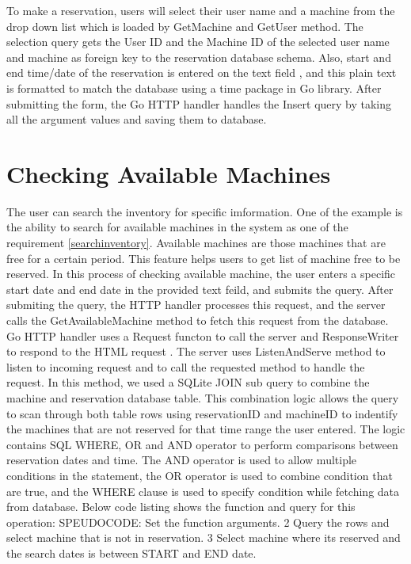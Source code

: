 To make a reservation, users will select their user name and a machine from the drop down list which is loaded by GetMachine and GetUser method. The selection query gets the User ID and the Machine ID of the selected user name and machine as foreign key to the reservation database schema. Also, start and end time/date of the reservation is entered on the text field , and this plain text is formatted to match the database using a time package in Go library. After submitting the form, the Go HTTP handler handles the Insert query by taking all the argument values and saving them to database. 
\section*{Checking Available Machines}
The user can search the inventory for specific imformation. One of the example is the ability to search for available machines in the system as one of the requirement \ref{searchinventory}. Available machines are those machines that are free for a certain period. This feature helps users to get list of machine free to be reserved. In this process of checking available machine, the user enters a specific start date and end date in the provided text feild, and submits the query. After submiting the query, the HTTP handler processes this request, and the server calls the GetAvailableMachine method to fetch this request from the database. Go HTTP handler uses a Request functon to call the server and  ResponseWriter to respond to the HTML request \cite{Gohttp}. The server uses ListenAndServe method to listen to incoming request and to call the requested method to handle the request. In this method, we used a SQLite JOIN sub query to combine the machine and reservation database table. This combination logic allows the query to scan through both table rows using reservationID and machineID to indentify the machines that are not reserved for that time range the user entered. The logic contains SQL WHERE, OR and AND operator to perform comparisons between reservation dates and time. \cite{ANDOR}The AND operator is used to allow multiple conditions in the statement,  the OR operator is used to combine condition that are true, and the WHERE clause is used to specify condition while fetching data from database\cite{WHEREclause}. 
\pagebreak
Below code listing shows the function and query for this operation:
SPEUDOCODE: Set the function arguments.
2 Query the rows and select machine that is not in reservation.
3 Select machine where its reserved and the search dates is between  START and END date. 
